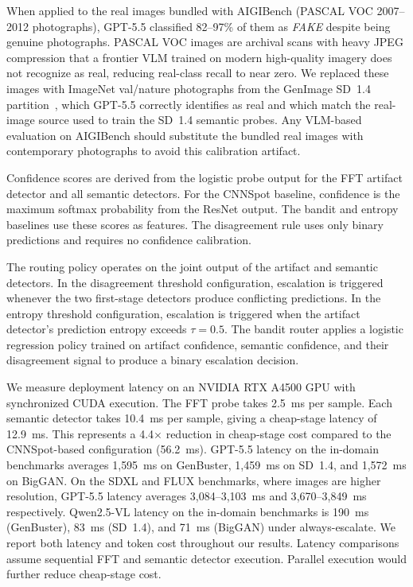 \documentclass{ieeeaccess}
\begin{document}
When applied to the real images bundled with AIGIBench (PASCAL VOC 2007--2012
photographs), GPT-5.5 classified 82--97\% of them as \emph{FAKE} despite being
genuine photographs. PASCAL VOC images are archival scans with heavy JPEG
compression that a frontier VLM trained on modern high-quality imagery does not
recognize as real, reducing real-class recall to near zero. We replaced these
images with ImageNet val/nature photographs from the GenImage SD~1.4
partition~\cite{NEURIPS2023_f4d4a021}, which GPT-5.5 correctly identifies as real
and which match the real-image source used to train the SD~1.4 semantic probes.
Any VLM-based evaluation on AIGIBench should substitute the bundled real images
with contemporary photographs to avoid this calibration artifact.


Confidence scores are derived from the logistic probe output for the FFT artifact detector and all semantic detectors. For the CNNSpot baseline, confidence is the maximum softmax probability from the ResNet output. The bandit and entropy baselines use these scores as features. The disagreement rule uses only binary predictions and requires no confidence
calibration.

The routing policy operates on the joint output of the artifact and semantic detectors. 
In the disagreement threshold configuration, escalation is triggered whenever the two first-stage detectors produce conflicting 
predictions. In the entropy threshold configuration, escalation is
triggered when the artifact detector's prediction entropy exceeds $\tau = 0.5$. The 
bandit router applies a logistic regression policy trained on artifact
confidence, semantic confidence, and their disagreement signal to produce 
a binary escalation decision.

We measure deployment latency on an NVIDIA RTX A4500 GPU with synchronized CUDA execution. The FFT probe takes 2.5~ms per sample. Each semantic detector takes 10.4~ms per sample,
giving a cheap-stage latency of 12.9~ms. This represents a 4.4$\times$ reduction in cheap-stage cost compared to the CNNSpot-based configuration (56.2~ms). GPT-5.5 latency on the in-domain benchmarks averages 1{,}595~ms on GenBuster, 1{,}459~ms on SD~1.4, and 1{,}572~ms on BigGAN. On the SDXL and FLUX benchmarks, where images are higher resolution, GPT-5.5 latency averages 3{,}084--3{,}103~ms and 3{,}670--3{,}849~ms respectively. Qwen2.5-VL
latency on the in-domain benchmarks is 190~ms (GenBuster), 83~ms (SD~1.4), and 71~ms
(BigGAN) under always-escalate. We report both latency and token cost throughout our results. Latency comparisons assume sequential FFT and semantic detector execution. Parallel
execution would further reduce cheap-stage cost.
\end{document}

